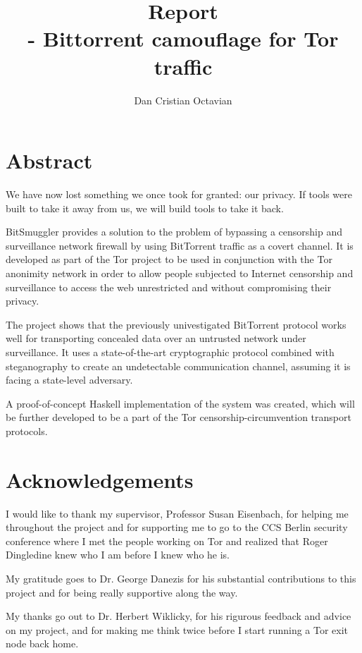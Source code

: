 \documentclass[11pt]{book} %
\title{Report \\ \projectName- Bittorrent camouflage for Tor traffic}
\author{Dan Cristian Octavian}
\newcommand{\projectName}{BitSmuggler }
\begin{document}
\newcommand{\myparagraph}[1]{\paragraph{#1}\mbox{}\\}
\maketitle

\chapter*{Abstract}
We have now lost something we once took for granted: our privacy. If tools were built to take it away from us, we will build tools to take it back.

\projectName provides a solution to the problem of bypassing a censorship and surveillance network firewall by using BitTorrent traffic as a covert channel. It is developed as part of the Tor project to be used in conjunction with the Tor anonimity network in order to allow people subjected to Internet censorship and surveillance to access the web unrestricted and without compromising their privacy.

The project shows that the previously univestigated BitTorrent protocol works well for transporting concealed data over an untrusted network under surveillance. It uses a state-of-the-art cryptographic protocol combined with steganography to create an undetectable communication channel, assuming it is facing a state-level adversary.

A proof-of-concept Haskell implementation of the system was created, which will be further developed to be a part of the Tor censorship-circumvention transport protocols.

\chapter*{Acknowledgements}

I would like to thank my supervisor, Professor Susan Eisenbach, for helping me throughout the project and for supporting me to go to the CCS Berlin security conference where I met the people working on Tor and realized that Roger Dingledine knew who I am before I knew who he is.

My gratitude goes to Dr. George Danezis for his substantial contributions to this project and for being really supportive along the way.

My thanks go out to Dr. Herbert Wiklicky, for his rigurous feedback and advice on my project, and for making me think twice before I start running a Tor exit node back home.
\end{document}
